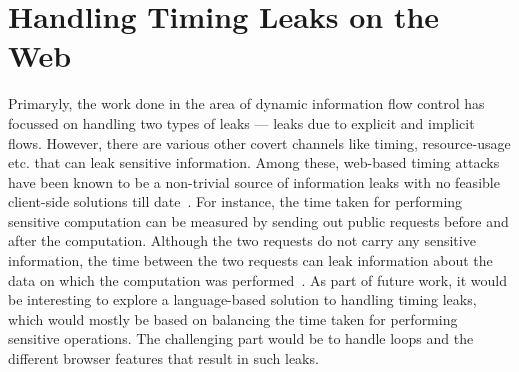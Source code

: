 \section{Handling Timing Leaks on the Web}
Primaryly, the work done in the area of dynamic information flow
control has focussed on handling two types of leaks ---
leaks due to explicit and implicit flows. However, there are various 
other covert channels like timing, resource-usage etc. that can leak
sensitive information. Among these, web-based timing attacks have been  
known to be a non-trivial source of information leaks with no feasible
client-side solutions till date~\cite{timing}. For instance, the time 
taken for performing sensitive computation can be measured by sending
out public requests before and after the computation. Although the two
requests do not carry any sensitive information, the time between the
two requests can leak information about the data on which the
computation was performed~\cite{timing}. As part of future work, it
would be interesting to explore a language-based solution to handling
timing leaks, which would mostly be based on balancing the time taken
for performing sensitive operations. The challenging part would be to 
handle loops and the different browser features that result in such
leaks. 

